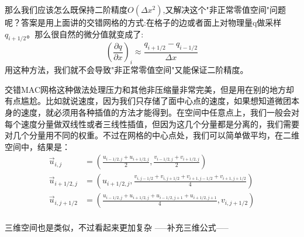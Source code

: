 \documentclass{article}
\begin{document}
\par
那么我们应该怎么既保持二阶精度$O(\Delta x^2)$,又解决这个"非正常零值空间"问题呢？答案是用上面讲的交错网格的方式:在格子的边或者面上对物理量q做采样$q_{i+1/2}$。那么很自然的微分值就变成了:
\begin{equation}
(\frac{\partial{q}}{\partial{x}})_i\approx \frac{q_{i+1/2}-q_{i-1/2}}{\Delta x}
\end{equation}
用这种方法，我们就不会导致"非正常零值空间"又能保证二阶精度。
\par
交错MAC网格这种做法处理压力和其他非压缩量非常完美，但是用在别的地方却有点尴尬。比如就说速度，因为我们只存储了面中心点的速度，如果想知道微团本身的速度，就必须用各种插值的方法才能得到。在空间中任意点上，我们一般会对每个速度分量做双线性或者三线性插值，但因为这几个分量都是分离的，我们需要对几个分量用不同的权重。不过在网格的中心点处，我们可以简单做平均，在二维空间中，结果是：
\begin{equation}
\begin{aligned}
\vec{u}_{i,j}&=(\frac{u_{i-1/2,j}+u_{i+1/2,j}}{2},\frac{v_{i-1/2,j}+v_{i+1/2,j}}{2}) \\
\vec{u}_{i+1/2,j}&=(u_{i+1/2,j},\frac{v_{i,j-1/2}+v_{i,j+1/2}+v_{i+1,j-1/2}+v_{i+1,j+1/2}}{4}) \\
\vec{u}_{i,j+1/2}&=(\frac{u_{i-1/2,j}+u_{i+1/2,j}+u_{i-1/2,j+1}+u_{i+1/2,j+1}}{4},v_{i,j+1/2}) \\
\end{aligned}
\end{equation}
\par
三维空间也是类似，不过看起来更加复杂
-----补充三维公式-----
\end{document}
